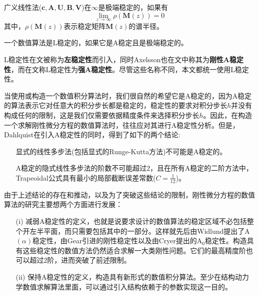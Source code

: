 \begin{definition}[极端稳定的]
广义线性法($\bm{c},\bm{A},\bm{U},\bm{B},\bm{V}$)在$\infty$是极端稳定的\cite{李寿佛2010}，如果有
\begin{equation}
\lim_{z\to\infty}\rho(\bm{M}(z))=0
\end{equation}
其中，$\rho(\bm{M}(z))$表示稳定矩阵$\bm{M}(z)$的谱半径。
\end{definition}
\begin{definition}[L稳定性]
一个数值算法是L稳定的\cite{Butcher2008,李寿佛2010,Jackiewicz2009}，如果它是A稳定且是极端稳定的。
\end{definition}
L稳定性在文被称为\textbf{左稳定性}而引入，同时Axelsson也在文中称其为\textbf{刚性A稳定性}，而在文称L稳定性为\textbf{强A稳定性}。尽管这些名称不同，本文都统一使用L稳定性。

当使用或构造一个数值积分算法时，我们很自然的希望它是A稳定的，因为A稳定的算法表示它对任意大的积分步长都是稳定的，稳定性的要求对积分步长$h$并没有构成任何的限制，这是我们仅需要依据精度条件来选择积分步长$h$。因此，在构造一个求解刚性微分方程的数值算法时，往往应对其进行A稳定性分析。但是，Dahlquist在引入A稳定性的同时，得到了如下的两个结论\cite{Dahlquist1963,Wanner2006,袁新鼎1987,ErnstHairer1996,book:dover}:
\begin{itemize}
\item[\ddag] 显式的线性多步法(包括显式的Runge-Kutta方法)不可能是A稳定的。
\item[\ddag] A稳定的隐式线性多步法的阶数不可能超过2，且在所有A稳定的二阶方法中，Trapeoidal公式具有最小的局部截断误差常数($C=\frac{1}{12}$)。
\end{itemize}
由于上述结论的存在和推动，以及为了突破这些结论的限制，刚性微分方程的数值算法的研究主要想两个方面进行发展：
\begin{itemize}
\item[(i)] 减弱A稳定性的定义，也就是说要求设计的数值算法的稳定区域不必包括整个开左半平面，而只需要包括其中的一部分。这样就先后由Widlund提出了A$(\alpha)$稳定性\cite{Widlund1967}，由Gear引进的刚性稳定性\cite{Gear1971a}以及由Cryer提出的$\text{A}_0$稳定性\cite{Cryer1973}。构造具有这些稳定性的数值方法仍然适合求解一大类刚性问题。它们的最高精度阶也可以超过2阶，进而突破了前述限制。
\item[(ii)] 保持A稳定性的定义，构造具有新形式的数值积分算法。至少在结构动力学数值求解算法里面，可以通过引入结构依赖于的参数实现这一目的。
\end{itemize}

